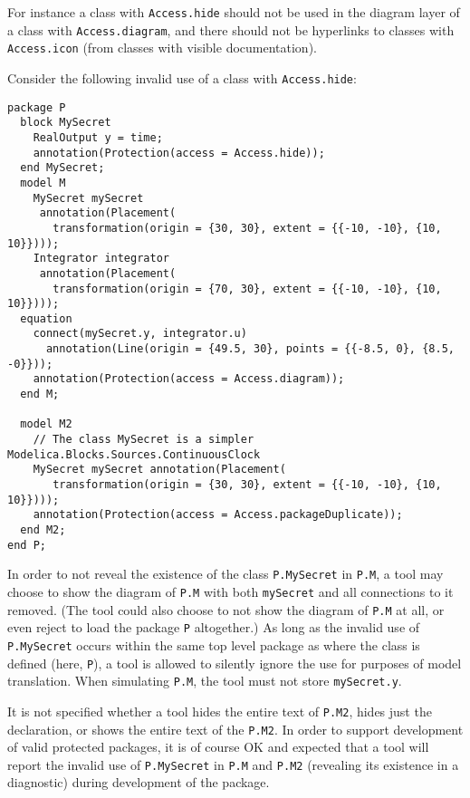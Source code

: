 \begin{example}
For instance a class with \lstinline!Access.hide! should not be used in the diagram layer of a class with \lstinline!Access.diagram!, and there should not be hyperlinks to classes with \lstinline!Access.icon! (from classes with visible documentation).

Consider the following invalid use of a class with \lstinline!Access.hide!:
\begin{lstlisting}[language=modelica]
package P
  block MySecret
    RealOutput y = time;
    annotation(Protection(access = Access.hide));
  end MySecret;
  model M
    MySecret mySecret
     annotation(Placement(
       transformation(origin = {30, 30}, extent = {{-10, -10}, {10, 10}})));
    Integrator integrator
     annotation(Placement(
       transformation(origin = {70, 30}, extent = {{-10, -10}, {10, 10}})));
  equation
    connect(mySecret.y, integrator.u)
      annotation(Line(origin = {49.5, 30}, points = {{-8.5, 0}, {8.5, -0}}));
    annotation(Protection(access = Access.diagram));
  end M;

  model M2
    // The class MySecret is a simpler Modelica.Blocks.Sources.ContinuousClock
    MySecret mySecret annotation(Placement(
       transformation(origin = {30, 30}, extent = {{-10, -10}, {10, 10}})));
    annotation(Protection(access = Access.packageDuplicate));
  end M2;
end P;
\end{lstlisting}
In order to not reveal the existence of the class \lstinline!P.MySecret! in \lstinline!P.M!, a tool may choose to show the diagram of \lstinline!P.M! with both \lstinline!mySecret! and all connections to it removed.
(The tool could also choose to not show the diagram of \lstinline!P.M! at all, or even reject to load the package \lstinline!P! altogether.)
As long as the invalid use of \lstinline!P.MySecret! occurs within the same top level package as where the class is defined (here, \lstinline!P!), a tool is allowed to silently ignore the use for purposes of model translation.
When simulating \lstinline!P.M!, the tool must not store \lstinline!mySecret.y!.

It is not specified whether a tool hides the entire text of \lstinline!P.M2!, hides just the declaration, or shows the entire text of the \lstinline!P.M2!.
In order to support development of valid protected packages, it is of course OK and expected that a tool will report the invalid use of \lstinline!P.MySecret! in \lstinline!P.M! and \lstinline!P.M2! (revealing its existence in a diagnostic) during development of the package.
\end{example}

